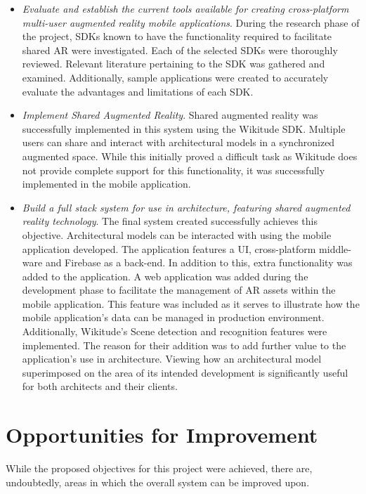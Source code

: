 \begin{itemize}
    \item \textit{Evaluate and establish the current tools available for creating cross-platform multi-user augmented reality mobile applications}. During the research phase of the project, SDKs known to have the functionality required to facilitate shared AR were investigated. Each of the selected SDKs were thoroughly reviewed. Relevant literature pertaining to the SDK was gathered and examined. Additionally, sample applications were created to accurately evaluate the advantages and limitations of each SDK. 
    
    \item \textit{Implement Shared Augmented Reality}. Shared augmented reality was successfully implemented in this system using the Wikitude SDK. Multiple users can share and interact with architectural models in a synchronized augmented space. While this initially proved a difficult task as Wikitude does not provide complete support for this functionality, it was successfully implemented in the mobile application.
    
    \item \textit{Build a full stack system for use in architecture, featuring shared augmented reality technology}. The final system created successfully achieves this objective. Architectural models can be interacted with using the mobile application developed. The application features a UI, cross-platform middle-ware and Firebase as a back-end. In addition to this, extra functionality was added to the application. A web application was added during the development phase to facilitate the management of AR assets within the mobile application. This feature was included as it serves to illustrate how the mobile application’s data can be managed in production environment. Additionally, Wikitude's Scene detection and recognition features were implemented. The reason for their addition was to add further value to the application’s use in architecture. Viewing how an architectural model superimposed on the area of its intended development is significantly useful for both architects and their clients. 
    
\end{itemize}

\section{Opportunities for Improvement}
While the proposed objectives for this project were achieved, there are, undoubtedly, areas in which the overall system can be improved upon.

